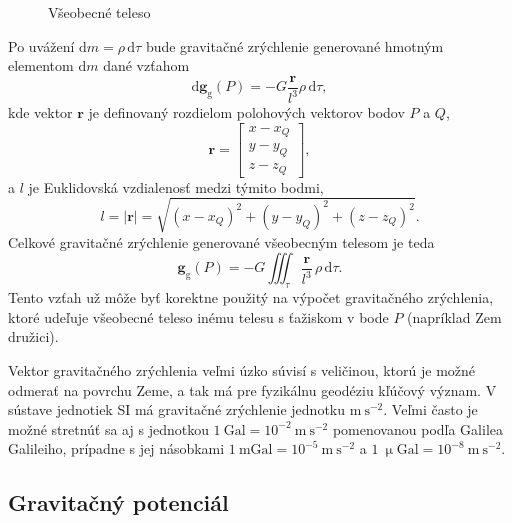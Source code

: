 \documentclass[a4paper, 12pt]{book}
\newcommand{\diff}{\mathrm d}
\newcommand{\gidx}{\mathrm g}
\let\vec\mathbf
\begin{document}
\begin{figure}
\centering

\caption{Všeobecné teleso}
\label{fig:gravitating_body}
\end{figure}

Po uvážení $\diff m = \rho \, \diff \tau$ bude gravitačné zrýchlenie generované 
hmotným elementom $\diff m$ dané vzťahom
%
\begin{equation}
\diff \vec g_\gidx(P) = -G \frac{\vec r}{l^3} \rho \, \diff\tau{,}
\end{equation}
%
kde vektor $\vec r$ je definovaný rozdielom polohových vektorov bodov $P$ 
a $Q$,
%
\begin{equation}
\label{eq:r}
\vec r = 
%
\begin{bmatrix}
x - x_Q \\
y - y_Q \\
z - z_Q
\end{bmatrix}
{,}
\end{equation}
%
a $l$ je Euklidovská vzdialenosť medzi týmito bodmi,
%
\begin{equation}
\label{eq:l}
l = | \vec r | = \sqrt{(x - x_Q)^2 + (y - y_Q)^2 + (z - z_Q)^2}{.}
\end{equation}
%
Celkové gravitačné zrýchlenie generované všeobecným telesom je teda
%
\begin{equation}
\label{eq:gg_body}
\vec g_\gidx(P) = -G \iiint_{\tau} \frac{\vec r}{l^3} \, \rho \, \diff\tau{.}
\end{equation}
%
Tento vzťah už môže byť korektne použitý na výpočet gravitačného zrýchlenia, 
ktoré udeľuje všeobecné teleso inému telesu s ťažiskom v bode $P$ (napríklad 
Zem družici).

Vektor gravitačného zrýchlenia veľmi úzko súvisí s veličinou, ktorú je možné 
odmerať na povrchu Zeme, a tak má pre fyzikálnu geodéziu kľúčový význam.  
V sústave jednotiek SI má gravitačné zrýchlenie jednotku $\mathrm{m}\ 
\mathrm{s}^{-2}$.  Veľmi často je možné stretnúť sa aj s jednotkou $1\ 
\mathrm{Gal} = 10^{-2}\ \mathrm{m}\ \mathrm{s}^{-2}$ pomenovanou podľa Galilea 
Galileiho, prípadne s jej násobkami $1\ \mathrm{mGal} = 10^{-5}\ \mathrm{m}\ 
\mathrm{s}^{-2}$ a $1\ \upmu \mathrm{Gal} = 10^{-8}\ \mathrm{m}\ 
\mathrm{s}^{-2}$.

\subsection{Gravitačný potenciál}
\label{sec:vg}
\end{document}

